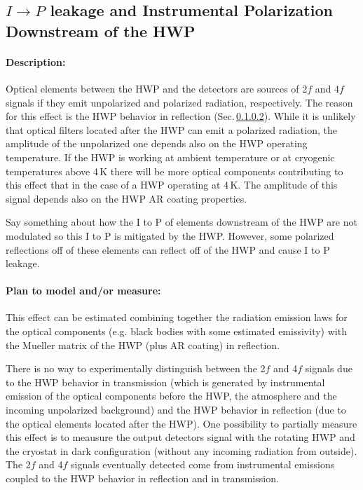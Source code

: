 \subsection{$I\rightarrow P$ leakage and Instrumental Polarization Downstream of the HWP}
\label{IP downstream of HWP}
\paragraph{Description:}
Optical elements between the HWP and the detectors are sources of 2$f$ and 4$f$ signals if they emit unpolarized and polarized radiation, respectively. The reason for this effect is the HWP behavior in reflection (Sec.\,\ref{}). While it is unlikely that optical filters located after the HWP can emit a polarized radiation, the amplitude of the unpolarized one depends also on the HWP operating temperature.
If the HWP is working at ambient temperature or at cryogenic temperatures above 4\,K there will be more optical components contributing to this effect that in the case of a HWP operating at 4\,K. The amplitude of this signal depends also on the HWP AR coating properties.

Say something about how the I to P of elements downstream of the HWP are not modulated so this I to P is mitigated by the HWP. However, some polarized reflections off of these elements can reflect off of the HWP and cause I to P leakage.

\paragraph{Plan to model and/or measure:}
This effect can be estimated combining together the radiation emission laws for the optical components (e.g. black bodies with some estimated emissivity) with the Mueller matrix of the HWP (plus AR coating) in reflection. 

There is no way to experimentally distinguish between the 2$f$ and 4$f$ signals due to the HWP behavior in transmission (which is generated by instrumental emission of the optical components before the HWP, the atmosphere and the incoming unpolarized background) and the HWP behavior in reflection (due to the optical elements located after the HWP). One possibility to partially measure this effect is to meausure the output detectors signal with the rotating HWP and the cryostat in dark configuration (without any incoming radiation from outside).
The 2$f$ and 4$f$ signals eventually detected come from instrumental emissions coupled to the HWP behavior in reflection and in transmission. 


